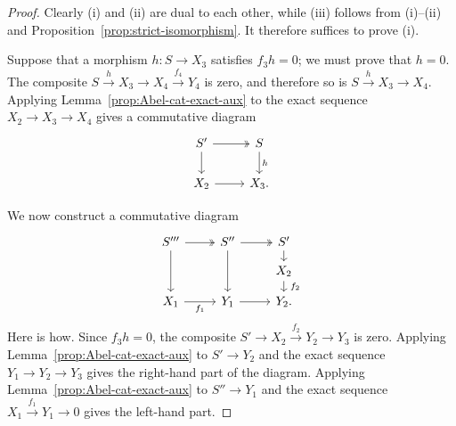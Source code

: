 \begin{proof}
	Clearly (i) and (ii) are dual to each other, while (iii) follows from
	(i)--(ii) and Proposition~\ref{prop:strict-isomorphism}. It therefore
	suffices to prove (i).
	
	Suppose that a morphism $h:S\to X_3$ satisfies $f_3h=0$; we must prove
	that $h=0$. The composite
	$S\xrightarrow{h}X_3\to X_4\xrightarrow{f_4}Y_4$ is zero, and therefore so
	is $S\xrightarrow{h}X_3\to X_4$. Applying
	Lemma~\ref{prop:Abel-cat-exact-aux} to the exact sequence
	$X_2\to X_3\to X_4$ gives a commutative diagram
	\[\begin{tikzcd}
		S' \arrow[twoheadrightarrow, r] \arrow[d] & S \arrow[d, "h"] \\
		X_2 \arrow[r] & X_3 .
	\end{tikzcd}\]

	We now construct a commutative diagram
	\[\begin{tikzcd}[row sep=small]
		S''' \arrow[twoheadrightarrow, r] \arrow[dd] & S'' \arrow[twoheadrightarrow, r] \arrow[dd] & S' \arrow[d] \\
		& & X_2 \arrow[d, "f_2" inner sep=0.5em] \\
		X_1 \arrow[r, "f_1"'] & Y_1 \arrow[r] & Y_2 . 
	\end{tikzcd}\]
	Here is how. Since $f_3h=0$, the composite
	$S'\to X_2\xrightarrow{f_2}Y_2\to Y_3$ is zero. Applying
	Lemma~\ref{prop:Abel-cat-exact-aux} to $S'\to Y_2$ and the exact sequence
	$Y_1\to Y_2\to Y_3$ gives the right-hand part of the diagram. Applying
	Lemma~\ref{prop:Abel-cat-exact-aux} to $S''\to Y_1$ and the exact sequence
	$X_1\xrightarrow{f_1}Y_1\to0$ gives the left-hand part.
	

\end{proof}

